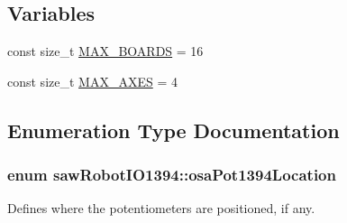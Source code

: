\subsection*{Variables}
\begin{DoxyCompactItemize}
\item 
const size\+\_\+t \hyperlink{namespacesaw_robot_i_o1394_a2ea4cc88435b1ca85b6c633ba6360af4}{M\+A\+X\+\_\+\+B\+O\+A\+R\+D\+S} = 16
\item 
const size\+\_\+t \hyperlink{namespacesaw_robot_i_o1394_a397b95aa9a72ba9aaf6cf10c9ef6a37a}{M\+A\+X\+\_\+\+A\+X\+E\+S} = 4
\end{DoxyCompactItemize}


\subsection{Enumeration Type Documentation}
\hypertarget{namespacesaw_robot_i_o1394_a9d63d89648f679b6af5cf3f16576bde9}{}
\subsubsection[{osa\+Pot1394\+Location}]{\setlength{\rightskip}{0pt plus 5cm}enum {\bf saw\+Robot\+I\+O1394\+::osa\+Pot1394\+Location}}\label{namespacesaw_robot_i_o1394_a9d63d89648f679b6af5cf3f16576bde9}


Defines where the potentiometers are positioned, if any. 

